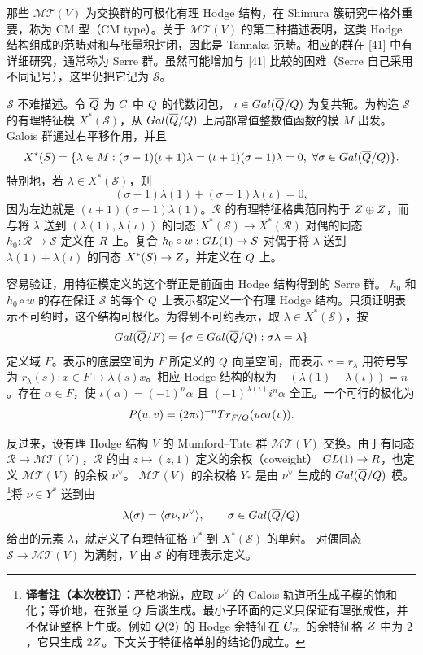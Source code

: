 那些 $\mathcal{MT}(V)$ 为交换群的可极化有理 Hodge 结构，在 Shimura 簇研究中格外重要，称为
CM 型（CM type）。关于 $\mathcal{MT}(V)$ 的第二种描述表明，这类 Hodge 结构组成的范畴对和与张量积封闭，因此是 Tannaka 范畴。相应的群在
[41] 中有详细研究，通常称为 Serre 群。虽然可能增加与 [41] 比较的困难（Serre 自己采用不同记号），这里仍把它记为
$\mathcal S$。

$\mathcal S$ 不难描述。令 $\overline{Q}$ 为 $C$ 中 $Q$ 的代数闭包，
$\iota\in Gal(\overline{Q}/Q)$ 为复共轭。为构造 $\mathcal S$ 的有理特征模
$X^*(\mathcal S)$，从 $Gal(\overline{Q}/Q)$ 上局部常值整数值函数的模
$M$ 出发。Galois 群通过右平移作用，并且
\[
X^*(S)=\{\lambda\in M:
(\sigma-1)(\iota+1)\lambda=(\iota+1)(\sigma-1)\lambda=0,
\ \forall\sigma\in Gal(\overline{Q}/Q)\}.
\]
特别地，若 $\lambda\in X^*(\mathcal S)$，则
\[
(\sigma-1)\lambda(1)+(\sigma-1)\lambda(\iota)=0,
\]
因为左边就是 $(\iota+1)(\sigma-1)\lambda(1)$。$\mathcal R$ 的有理特征格典范同构于
$Z\oplus Z$，而与将 $\lambda$ 送到 $(\lambda(1),\lambda(\iota))$ 的同态
$X^*(\mathcal S)\to X^*(\mathcal R)$ 对偶的同态
$h_0:\mathcal R\to\mathcal S$ 定义在 $R$ 上。复合
$h_0\circ w:GL(1)\to S$ 对偶于将 $\lambda$ 送到
$\lambda(1)+\lambda(\iota)$ 的同态 $X^*(S)\to Z$，并定义在 $Q$ 上。

容易验证，用特征模定义的这个群正是前面由 Hodge 结构得到的 Serre 群。
$h_0$ 和 $h_0\circ w$ 的存在保证 $\mathcal S$ 的每个 $Q$ 上表示都定义一个有理 Hodge 结构。只须证明表示不可约时，这个结构可极化。为得到不可约表示，取
$\lambda\in X^*(\mathcal S)$，按
\[
Gal(\overline{Q}/F)=\{\sigma\in Gal(\overline{Q}/Q):\sigma\lambda=\lambda\}
\]
定义域 $F$。表示的底层空间为 $F$ 所定义的 $Q$ 向量空间，而表示
$r=r_\lambda$ 用符号写为 $r_\lambda(s):x\in F\mapsto\lambda(s)x$。相应 Hodge 结构的权为
$-(\lambda(1)+\lambda(\iota))=n$。存在 $\alpha\in F$，使
$\iota(\alpha)=(-1)^n\alpha$ 且 $(-1)^{\lambda(\iota)}i^n\alpha$ 全正。一个可行的极化为
\[
P(u,v)=(2\pi i)^{-n}Tr_{F/Q}(u\alpha\iota(v)).
\]

反过来，设有理 Hodge 结构 $V$ 的 Mumford--Tate 群 $\mathcal{MT}(V)$ 交换。由于有同态
$\mathcal R\to\mathcal{MT}(V)$，$\mathcal R$ 的由 $z\mapsto(z,1)$ 定义的余权（coweight）
$GL(1)\to R$，也定义 $\mathcal{MT}(V)$ 的余权 $\nu^\vee$。
$\mathcal{MT}(V)$ 的余权格 $Y_*$ 是由 $\nu^\vee$ 生成的
$Gal(\overline{Q}/Q)$ 模。\footnote{\textbf{译者注（本次校订）：}严格地说，应取 $\nu^\vee$ 的 Galois 轨道所生成子模的饱和化；等价地，在张量 $Q$ 后谈生成。最小子环面的定义只保证有理张成性，并不保证整格上生成。例如 $Q(2)$ 的 Hodge 余特征在 $G_{m}$ 的余特征格 $Z$ 中为 $2$，它只生成 $2Z$。下文关于特征格单射的结论仍成立。}将 $\nu\in Y^*$ 送到由
\[
\lambda(\sigma)=\langle\sigma\nu,\nu^\vee\rangle,
\qquad\sigma\in Gal(\overline{Q}/Q)
\]
给出的元素 $\lambda$，就定义了有理特征格 $Y^*$ 到 $X^*(\mathcal S)$ 的单射。
对偶同态 $\mathcal S\to\mathcal{MT}(V)$ 为满射，$V$ 由 $\mathcal S$ 的有理表示定义。


